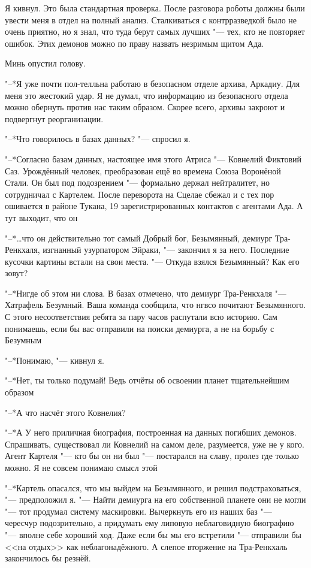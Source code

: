 \documentclass[a4paper,10pt,fleqn]{book}
\newcommand{\ldotst}{\so{...}\xspace}
\begin{document}
Я кивнул.
Это была стандартная проверка.
После разговора роботы должны были увести меня в отдел на полный анализ.
Сталкиваться с контрразведкой было не очень приятно, но я знал, что туда берут самых лучших "--- тех, кто не повторяет ошибок.
Этих демонов можно по праву назвать незримым щитом Ада.

Минь опустил голову.

"--*Я уже почти пол-телльна работаю в безопасном отделе архива, Аркадиу.
Для меня это жестокий удар.
Я не думал, что информацию из безопасного отдела можно обернуть против нас таким образом.
Скорее всего, архивы закроют и подвергнут реорганизации.

"--*Что говорилось в базах данных? "--- спросил я.

"--*Согласно базам данных, настоящее имя этого Атриса "--- Ковнелий Фиктовий Саз.
Урождённый человек, преобразован ещё во времена Союза Воронёной Стали.
Он был под подозрением "--- формально держал нейтралитет, но сотрудничал с Картелем.
После переворота на Сцелае сбежал и с тех пор ошивается в районе Тукана, 19 зарегистрированных контактов с агентами Ада.
А тут выходит, что он\ldotst

"--*\ldots что он действительно тот самый Добрый бог, Безымянный, демиург Тра-Ренкхаля, изгнанный узурпатором Эйраки, "--- закончил я за него.
Последние кусочки картины встали на свои места.
"--- Откуда взялся Безымянный?
Как его зовут?

"--*Нигде об этом ни слова. В базах отмечено, что демиург Тра-Ренкхаля "--- Хатрафель Безумный.
Ваша команда сообщила, что нгвсо почитают Безымянного.
С этого несоответствия ребята за пару часов распутали всю историю.
Сам понимаешь, если бы вас отправили на поиски демиурга, а не на борьбу с Безумным\ldotst

"--*Понимаю, "--- кивнул я.

"--*Нет, ты только подумай!
Ведь отчёты об освоении планет тщательнейшим образом\ldotst

"--*А что насчёт этого Ковнелия?

"--*А\ldotst
У него приличная биография, построенная на данных погибших демонов.
Спрашивать, существовал ли Ковнелий на самом деле, разумеется, уже не у кого.
Агент Картеля "--- кто бы он ни был "--- постарался на славу, пролез где только можно.
Я не совсем понимаю смысл этой\ldotst

"--*Картель опасался, что мы выйдем на Безымянного, и решил подстраховаться, "--- предположил я.
"--- Найти демиурга на его собственной планете они не могли "--- тот продумал систему маскировки.
Вычеркнуть его из наших баз "--- чересчур подозрительно, а придумать ему липовую неблаговидную биографию "--- вполне себе хороший ход.
Даже если бы мы его встретили "--- отправили бы <<на отдых>> как неблагонадёжного.
А слепое вторжение на Тра-Ренкхаль закончилось бы резнёй.
\end{document}
